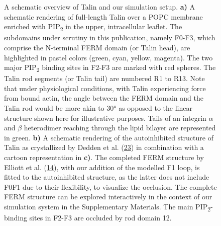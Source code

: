 \documentclass[
  twocolumn]{biophys-new-mod}
\begin{document}
\begin{figure}
\begin{minipage}[t]{0.50\linewidth}
{\centering 


}

\subcaption{\label{fig-tln-align-autoinhib}~}
\end{minipage}%

\caption{\label{fig-structure}A schematic overview of Talin and our
simulation setup. \textbf{a)} A schematic rendering of full-length Talin
over a POPC membrane enriched with PIP\textsubscript{2} in the upper,
intracellular leaflet. The subdomains under scrutiny in this
publication, namely F0-F3, which comprise the N-terminal FERM domain (or
Talin head), are highlighted in pastel colors (green, cyan, yellow,
magenta). The two major PIP\textsubscript{2} binding sites in F2-F3 are
marked with red spheres. The Talin rod segments (or Talin tail) are
numbered R1 to R13. Note that under physiological conditions, with Talin
experiencing force from bound actin, the angle between the FERM domain
and the Talin rod would be more akin to 30° as opposed to the linear
structure shown here for illustrative purposes. Tails of an integrin
\(\alpha\) and \(\beta\) heterodimer reaching through the lipid bilayer
are represented in green. \textbf{b)} A schematic rendering of the
autoinhibited structure of Talin as crystallized by Dedden et al.
(\protect\hyperlink{ref-deddenArchitectureTalin1Reveals2019a}{23}) in
combination with a cartoon representation in \textbf{c)}. The completed
FERM structure by Elliott et al.
(\protect\hyperlink{ref-elliottStructureTalinHead2010}{14}), with our
addition of the modelled F1 loop, is fitted to the autoinhibited
structure, as the latter does not include F0F1 due to their flexibility,
to visualize the occlusion. The complete FERM structure can be explored
interactively in the context of our simulation system in the
Supplementary Materials. The main PIP\textsubscript{2}-binding sites in
F2-F3 are occluded by rod domain 12.}

\end{figure}
\end{document}
